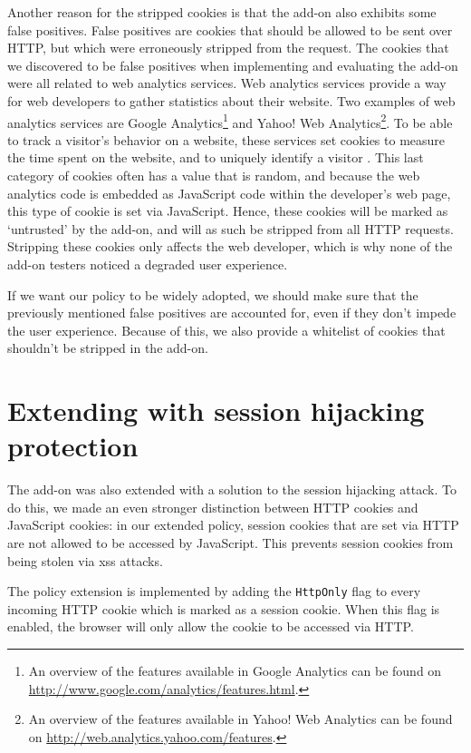 Another reason for the stripped cookies is that the add-on also exhibits some false positives. False positives are cookies that should be allowed to be sent over HTTP, but which were erroneously stripped from the request. The cookies that we discovered to be false positives when implementing and evaluating the add-on were all related to web analytics services. Web analytics services provide a way for web developers to gather statistics about their website. Two examples of web analytics services are Google Analytics\footnote{An overview of the features available in Google Analytics can be found on \url{http://www.google.com/analytics/features.html}.} and Yahoo! Web Analytics\footnote{An overview of the features available in Yahoo! Web Analytics can be found on \url{http://web.analytics.yahoo.com/features}.}. To be able to track a visitor's behavior on a website, these services set cookies to measure the time spent on the website, and to uniquely identify a visitor \cite{Tappenden2009,GoogleAnalytics}. This last category of cookies often has a value that is random, and because the web analytics code is embedded as JavaScript code within the developer's web page, this type of cookie is set via JavaScript. Hence, these cookies will be marked as `untrusted' by the add-on, and will as such be stripped from all HTTP requests. Stripping these cookies only affects the web developer, which is why none of the add-on testers noticed a degraded user experience.

If we want our policy to be widely adopted, we should make sure that the previously mentioned false positives are accounted for, even if they don't impede the user experience. Because of this, we also provide a whitelist of cookies that shouldn't be stripped in the add-on.

\section{Extending with session hijacking protection}

The add-on was also extended with a solution to the session hijacking attack. To do this, we made an even stronger distinction between HTTP cookies and JavaScript cookies: in our extended policy, session cookies that are set via HTTP are not allowed to be accessed by JavaScript. This prevents session cookies from being stolen via \gls{xss} attacks.

The policy extension is implemented by adding the \texttt{HttpOnly} flag to every incoming HTTP cookie which is marked as a session cookie. When this flag is enabled, the browser will only allow the cookie to be accessed via HTTP.


